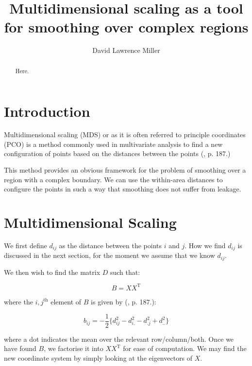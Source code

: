 \documentclass[a4paper,10pt]{amsart}
\title{Multidimensional scaling as a tool for smoothing over complex regions}
\author{David Lawrence Miller}
\newcommand{\tr}[1]{#1^{\text{T}}}
\begin{document}
 
\begin{abstract}
Here.
\end{abstract}
 
 
\newtheorem{thm}{Theorem}[section]
 
\newtheorem{defn}{Definition}[section]
 
\maketitle


\section{Introduction}

Multidimensional scaling (MDS) or as it is often referred to principle coordinates (PCO) is a method commonly used in multivariate analysis to find a new configuration of points based on the distances between the points (\cite{chatfieldcollins}, p. 187.)

This method provides an obvious framework for the problem of smoothing over a region with a complex boundary. We can use the within-area distances to configure the points in such a way that smoothing does not suffer from leakage.

\section{Multidimensional Scaling}

We first define $d_{ij}$ as the distance between the points $i$ and $j$. How we find $d_{ij}$ is discussed in the next section, for the moment we assume that we know $d_{ij}$.

We then wish to find the matrix $D$ such that:

\begin{equation*}
B=X\tr{X}
\end{equation*}

where the $i,j^{\text{th}}$ element of $B$ is given by (\cite{chatfieldcollins}, p. 187.):

\begin{equation*}
b_{ij}=-\frac{1}{2}\{ d^2_{ij} - d^2_{i.} - d^2_{.j} + d^2_{..} \}
\end{equation*}

where a dot indicates the mean over the relevant row/column/both. Once we have found $B$, we factorise it into $X\tr{X}$ for ease of computation. We may find the new coordinate system by simply looking at the eigenvectors of $X$.
\end{document}
